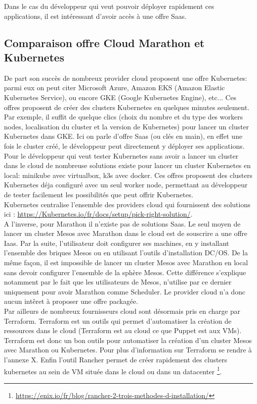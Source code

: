 \documentclass[11pt,fleqn]{book} %
\begin{document}
Dans le cas du développeur qui veut pouvoir déployer rapidement ces applications, il est intéressant d'avoir accès à une offre Saas.

\subsection{Comparaison offre Cloud Marathon et Kubernetes}
De part son succès de nombreux provider cloud proposent une offre Kubernetes: parmi eux on peut citer Microsoft Azure, Amazon EKS (Amazon Elastic Kubernetes Service), ou encore GKE (Google Kubernetes Engine), etc... Ces offres proposent de créer des clusters Kubernetes en quelques minutes seulement. Par exemple, il suffit de quelque clics (choix du nombre et du type des workers nodes, localisation du cluster et la version de Kubernetes) pour lancer un cluster Kubernetes dans GKE. Ici on parle d'offre Saas (ou clés en main), en effet une fois le cluster créé, le développeur peut directement y déployer ses applications.\\

Pour le développeur qui veut tester Kubernetes sans avoir a lancer un cluster dans le cloud de nombreuse solutions existe pour lancer un cluster Kubernetes en local: minikube avec virtualbox, k3s avec docker. Ces offres proposent des clusters Kubernetes déja configuré avec un seul worker node, permettant au développeur de tester facilement les possibilités que peut offrir Kubernetes.\\

Kubernetes centralise l'ensemble des providers cloud qui fournissent des solutions ici : \url{https://Kubernetes.io/fr/docs/setup/pick-right-solution/}. \\

A l'inverse, pour Marathon il n'existe pas de solutions Saas. Le seul moyen de lancer un cluster Mesos avec Marathon dans le cloud est de souscrire a une offre Iaas. Par la suite, l'utilisateur doit configurer ses machines, en y installant l'ensemble des briques Mesos ou en utilisant l'outils d'installation DC/OS. De la même façon, il est impossible de lancer un cluster Mesos avec Marathon en local sans devoir configurer l'ensemble de la sphère Mesos. Cette différence s'explique notamment par le fait que les utilisateurs de Mesos, n'utilise par ce dernier uniquement pour avoir Marathon comme Scheduler. Le provider cloud n'a donc aucun intêret à proposer une offre packagée.\\

Par ailleurs de nombreux fournisseurs cloud sont désormais pris en charge par Terraform. Terraform est un outils qui permet d'automatiser la création de ressources dans le cloud (Terraform est au cloud ce que Puppet est aux VMs). Terraform est donc un bon outils pour automatiser la création d'un cluster Mesos avec Marathon ou Kubernetes. Pour plus d'information sur Terraform se rendre à l'annexe X. Enfin l'outil Rancher permet de créer rapidement des clusters kubernetes au sein de VM située dans le cloud ou dans un datacenter \footnote{\url{https://enix.io/fr/blog/rancher-2-trois-methodes-d-installation/}}.
\end{document}
